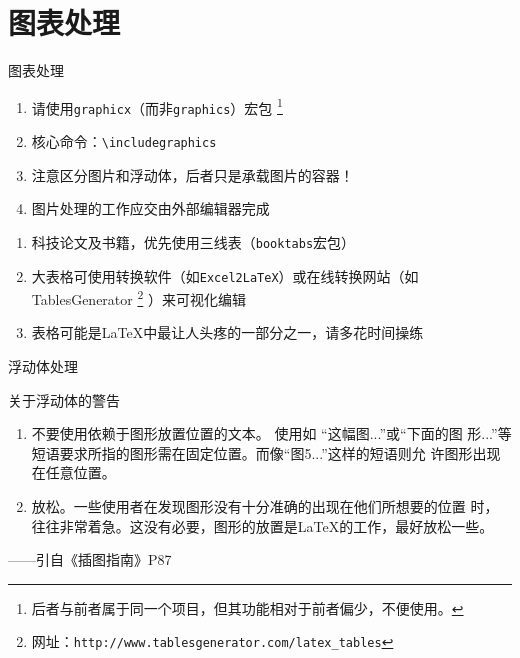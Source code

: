 \documentclass[10pt]{beamer}
\begin{document}
\section{图表处理}
\begin{frame}{图表处理}
\begin{enumerate}
    \item 请使用\texttt{graphicx}（而非\texttt{graphics}）宏包
    \footnote{后者与前者属于同一个项目，但其功能相对于前者偏少，不便使用。}
    \item 核心命令：\texttt{\textbackslash{}includegraphics}
    \item 注意区分图片和浮动体，后者只是承载图片的容器！
    \item 图片处理的工作应交由外部编辑器完成
\end{enumerate}

\begin{enumerate}
    \item 科技论文及书籍，优先使用三线表（\texttt{booktabs}宏包）
    \item 大表格可使用转换软件（如\texttt{Excel2LaTeX}）或在线转换网站（如{TablesGenerator}
    \footnote{网址：\texttt{http://www.tablesgenerator.com/latex\_tables}}
    ）来可视化编辑
    \item 表格可能是\LaTeX 中最让人头疼的一部分之一，请多花时间操练
\end{enumerate}
\end{frame}
\begin{frame}{浮动体处理}
\begin{alertblock}{关于浮动体的警告}
\begin{enumerate}\kaishu
    \item {\heiti 不要使用依赖于图形放置位置的文本。} 使用如 “这幅图...”或“下面的图
    形...”等短语要求所指的图形需在固定位置。而像“图5...”这样的短语则允
    许图形出现在任意位置\footnotemark。
    \item {\heiti 放松。}一些使用者在发现图形没有十分准确的出现在他们所想要的位置
    时，往往非常着急。这没有必要，图形的放置是\LaTeX{}的工作，最好放松一些。
\end{enumerate}
\begin{flushright}
——引自《\LaTeXe 插图指南》P87
\end{flushright}
\end{alertblock}
\end{frame}
\end{document}
